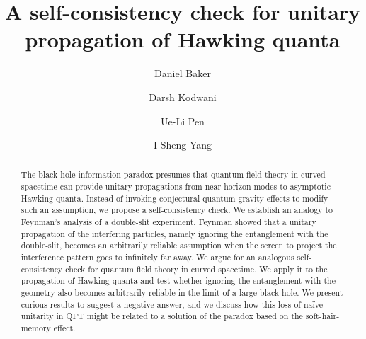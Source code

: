 \documentclass[aps,showpacs,onecolumn,floats,prd,superscriptaddress,nofootinbib]{revtex4-1}
\begin{document}
\title{A self-consistency check for unitary propagation of Hawking quanta}

\author{Daniel Baker}

\author{Darsh Kodwani}

\author{Ue-Li Pen}

\author{I-Sheng Yang}


\begin{abstract}
The black hole information paradox presumes that quantum field theory in curved spacetime can provide unitary propagations from near-horizon modes to asymptotic Hawking quanta. 
Instead of invoking conjectural quantum-gravity effects to modify such an assumption, we propose a self-consistency check.
We establish an analogy to Feynman's analysis of a double-slit experiment. 
Feynman showed that a unitary propagation of the interfering particles, namely ignoring the entanglement with the double-slit, becomes an arbitrarily reliable assumption when the screen to project the interference pattern goes to infinitely far away.
We argue for an analogous self-consistency check for quantum field theory in curved spacetime.
We apply it to the propagation of Hawking quanta and test whether ignoring the entanglement with the geometry also becomes arbitrarily reliable in the limit of a large black hole. 
We present curious results to suggest a negative answer, and we discuss how this loss of na\"ive unitarity in QFT might be related to a solution of the paradox based on the soft-hair-memory effect.
\end{abstract}
\end{document}

